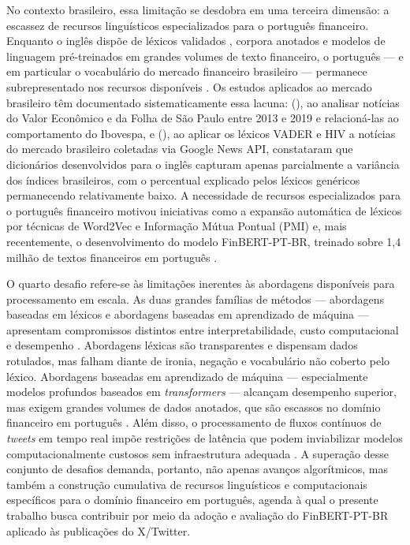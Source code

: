 No contexto brasileiro, essa limitação se desdobra em uma terceira dimensão: a escassez de recursos linguísticos especializados para o português financeiro. Enquanto o inglês dispõe de léxicos validados \cite{loughran2011}, corpora anotados e modelos de linguagem pré-treinados em grandes volumes de texto financeiro, o português --- e em particular o vocabulário do mercado financeiro brasileiro --- permanece subrepresentado nos recursos disponíveis \cite{sousa2025}. Os estudos aplicados ao mercado brasileiro têm documentado sistematicamente essa lacuna: \citeauthor{falcao2020} (\citeyear{falcao2020}), ao analisar notícias do Valor Econômico e da Folha de São Paulo entre 2013 e 2019 e relacioná-las ao comportamento do Ibovespa, e \citeauthor{lucas2025} (\citeyear{lucas2025}), ao aplicar os léxicos VADER e HIV a notícias do mercado brasileiro coletadas via Google News API, constataram que dicionários desenvolvidos para o inglês capturam apenas parcialmente a variância dos índices brasileiros, com o percentual explicado pelos léxicos genéricos permanecendo relativamente baixo. A necessidade de recursos especializados para o português financeiro motivou iniciativas como a
expansão automática de léxicos por técnicas de Word2Vec e Informação Mútua Pontual (PMI) \cite{sousa2025} e, mais recentemente, o desenvolvimento do modelo FinBERT-PT-BR, treinado sobre 1,4 milhão de textos financeiros em português \cite{santos2023finbert}.

O quarto desafio refere-se às limitações inerentes às abordagens disponíveis para processamento em escala. As duas grandes famílias de métodos --- abordagens baseadas em léxicos e abordagens baseadas em aprendizado de máquina --- apresentam compromissos distintos entre interpretabilidade, custo computacional e desempenho \cite{kearney2014}. Abordagens léxicas são transparentes e dispensam dados rotulados, mas falham diante de ironia, negação e vocabulário não coberto pelo léxico. Abordagens baseadas em aprendizado de máquina --- especialmente modelos profundos baseados em \textit{transformers} --- alcançam desempenho superior, mas exigem grandes volumes de dados anotados, que são escassos no domínio financeiro em português \cite{liu2020survey,santos2023finbert}. Além disso, o processamento de fluxos contínuos de \textit{tweets} em tempo real impõe restrições de latência que podem inviabilizar modelos computacionalmente custosos sem infraestrutura adequada \cite{silva2025}. A superação desse conjunto de desafios demanda, portanto, não apenas avanços algorítmicos, mas também a construção cumulativa de recursos linguísticos e computacionais específicos para o domínio financeiro em português, agenda à qual o presente trabalho busca contribuir por meio da adoção e avaliação do FinBERT-PT-BR aplicado às publicações do X/Twitter.